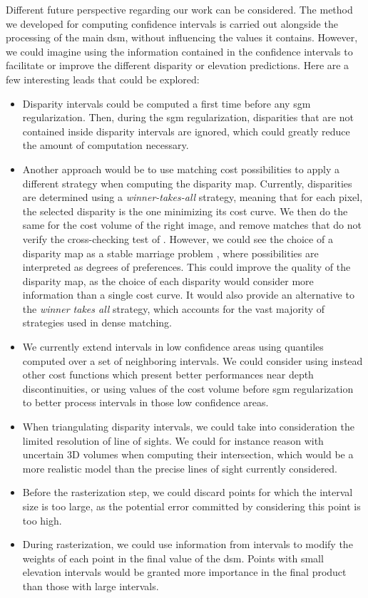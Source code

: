 Different future perspective regarding our work can be considered. The method we developed for computing confidence intervals is carried out alongside the processing of the main \acrshort{dsm}, without influencing the values it contains. However, we could imagine using the information contained in the confidence intervals to facilitate or improve the different disparity or elevation predictions. Here are a few interesting leads that could be explored:
\begin{itemize}
    \item Disparity intervals could be computed a first time before any \acrshort{sgm} regularization. Then, during the \acrshort{sgm} regularization, disparities that are not contained inside disparity intervals are ignored, which could greatly reduce the amount of computation necessary. 
    \item Another approach would be to use matching cost possibilities to apply a different strategy when computing the disparity map. Currently, disparities are determined using a \textit{winner-takes-all} strategy, meaning that for each pixel, the selected disparity is the one minimizing its cost curve. We then do the same for the cost volume of the right image, and remove matches that do not verify the cross-checking test of . However, we could see the choice of a disparity map as a stable marriage problem \cite{irving_matching_1998}, where possibilities are interpreted as degrees of preferences. This could improve the quality of the disparity map, as the choice of each disparity would consider more information than a single cost curve. It would also provide an alternative to the \textit{winner takes all} strategy, which accounts for the vast majority of strategies used in dense matching.  
    \item We currently extend intervals in low confidence areas using quantiles computed over a set of neighboring intervals. We could consider using instead other cost functions which present better performances near depth discontinuities, or using values of the cost volume before \acrshort{sgm} regularization to better process intervals in those low confidence areas.
    \item When triangulating disparity intervals, we could take into consideration the limited resolution of line of sights. We could for instance reason with uncertain 3D volumes when computing their intersection, which would be a more realistic model than the precise lines of sight currently considered.
    \item Before the rasterization step, we could discard points for which the interval size is too large, as the potential error committed by considering this point is too high. 
    \item During rasterization, we could use information from intervals to modify the weights of each point in the final value of the \acrshort{dsm}. Points with small elevation intervals would be granted more importance in the final product than those with large intervals. 
\end{itemize}

